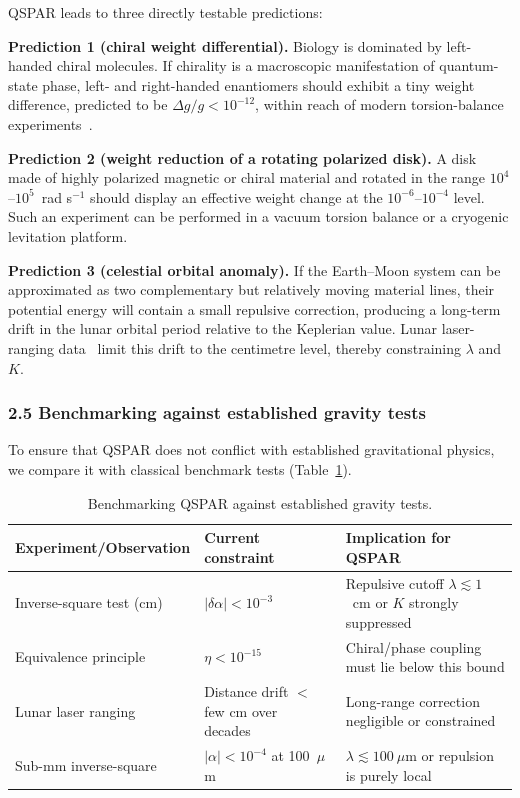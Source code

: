 \documentclass[12pt,a4paper]{article}
\begin{document}
QSPAR leads to three directly testable predictions:

\noindent\textbf{Prediction 1 (chiral weight differential).} Biology is dominated by left-handed chiral molecules. If chirality is a macroscopic manifestation of quantum-state phase, left- and right-handed enantiomers should exhibit a tiny weight difference, predicted to be $\Delta g/g < 10^{-12}$, within reach of modern torsion-balance experiments~\cite{schlamminger2008}.

\noindent\textbf{Prediction 2 (weight reduction of a rotating polarized disk).} A disk made of highly polarized magnetic or chiral material and rotated in the range $10^4$--$10^5$~rad s$^{-1}$ should display an effective weight change at the $10^{-6}$--$10^{-4}$ level. Such an experiment can be performed in a vacuum torsion balance or a cryogenic levitation platform.

\noindent\textbf{Prediction 3 (celestial orbital anomaly).} If the Earth--Moon system can be approximated as two complementary but relatively moving material lines, their potential energy will contain a small repulsive correction, producing a long-term drift in the lunar orbital period relative to the Keplerian value. Lunar laser-ranging data~\cite{will2014} limit this drift to the centimetre level, thereby constraining $\lambda$ and $K$.

\subsubsection*{2.5 Benchmarking against established gravity tests}

To ensure that QSPAR does not conflict with established gravitational physics, we compare it with classical benchmark tests (Table~\ref{tab:benchmarks}).

\begin{table}[htbp]
\centering
\caption{Benchmarking QSPAR against established gravity tests.}
\label{tab:benchmarks}
\begin{tabular}{@{}p{4.2cm}p{4.5cm}p{5.8cm}@{}}
\toprule
Experiment/Observation & Current constraint & Implication for QSPAR \\
\midrule
Inverse-square test (cm) & $|\delta\alpha| < 10^{-3}$~\cite{adelberger2003} & Repulsive cutoff $\lambda \lesssim 1$~cm or $K$ strongly suppressed \\
Equivalence principle & $\eta < 10^{-15}$~\cite{schlamminger2008} & Chiral/phase coupling must lie below this bound \\
Lunar laser ranging & Distance drift $<$ few cm over decades~\cite{will2014} & Long-range correction negligible or constrained \\
Sub-mm inverse-square & $|\alpha| < 10^{-4}$ at 100~$\mu$m~\cite{hoyle2004} & $\lambda \lesssim 100~\mu$m or repulsion is purely local \\
\bottomrule
\end{tabular}
\end{table}
\end{document}
